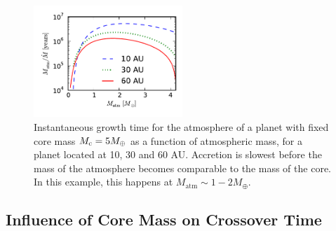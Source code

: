 \documentclass[apj]{emulateapj}
\begin{document}

\begin{figure}[h]
\centering
\includegraphics[width=0.5\textwidth]{../../figs/ModelAtmospheres/RadSelfGravPoly/PaperFigs/Mt_profile.pdf}
\caption{Instantaneous growth time for the atmosphere of a planet with fixed core mass $M_{\rm c}=5 M_{\oplus}$ as a function of atmospheric mass, for a planet located at 10, 30 and 60 AU. Accretion is slowest before the mass of the atmosphere becomes comparable to the mass of the core. In this example, this happens at $M_{\mathrm{atm}} \sim 1-2 M_{\oplus}$.}
\label{fig:growthtime}
\end{figure}

\subsection{Influence of Core Mass on Crossover Time}
\label{Mct}
\end{document}
